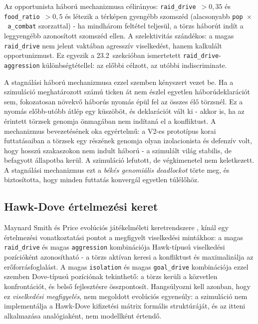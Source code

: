 ﻿\documentclass[a4paper,12pt]{report}
\begin{document}
Az opportunista háború mechanizmusa célirányos: \texttt{raid\_drive}~$> 0{,}35$
és \texttt{food\_ratio}~$> 0{,}5$ és létezik a térképen gyengébb szomszéd
(alacsonyabb \texttt{pop~$\times$~a\_combat} szorzattal) - ha mindhárom feltétel
teljesül, a törzs háborút indít a leggyengébb azonosított szomszéd ellen.
A szelektivitás szándékos: a magas \texttt{raid\_drive} nem jelent vaktában
agresszív viselkedést, hanem kalkulált opportunizmust. Ez egyezik a 23.2~szekcióban
ismertetett \texttt{raid\_drive}-\texttt{aggression} különbségtétellel: az előbbi
célzott, az utóbbi indiscriminate.

A stagnálási háború mechanizmusa ezzel szemben kényszert vezet be. Ha a szimuláció
meghatározott számú ticken át nem észlel egyetlen háborúdeklarációt sem, fokozatosan
növekvő háborús nyomás épül fel az összes élő törzsnél. Ez a nyomás előbb-utóbb
átlép egy küszöböt, és deklarációt vált ki - akkor is, ha az érintett törzsek genomja
önmagában nem indítaná el a konfliktust. A mechanizmus bevezetésének oka egyértelmű:
a V2-es prototípus korai futtatásaiban a törzsek egy részének genomja olyan izolacionista
és defenzív volt, hogy hosszú szakaszokon nem indult háború - a szimulált világ stabilis,
de befagyott állapotba kerül. A szimuláció lefutott, de végkimenetel nem keletkezett.
A stagnálási mechanizmus ezt a \textit{békés genomiális deadlockot} törte meg, és
biztosította, hogy minden futtatás konvergál egyetlen túlélőhöz.

\subsection*{Hawk-Dove értelmezési keret}

Maynard Smith és Price evolúciós játékelméleti keretrendszere \cite{maynardsmithprice1973},
\cite{maynardsmith1982} kínál egy értelmezési vonatkoztatási pontot a megfigyelt
viselkedési mintákhoz: a magas \texttt{raid\_drive} és magas \texttt{aggression}
kombinációja Hawk-típusú viselkedési pozícióként azonosítható - a törzs aktívan keresi
a konfliktust és maximalizálja az erőforrásfoglalást. A magas \texttt{isolation} és magas
\texttt{goal\_drive} kombinációja ezzel szemben Dove-típusú pozíciónak tekinthető:
a törzs kerüli a közvetlen konfrontációt, és belső fejlesztésre összpontosít.
Hangsúlyozni kell azonban, hogy ez \textit{viselkedési megfigyelés}, nem megoldott
evolúciós egyensúly: a szimuláció nem implementálja a Hawk-Dove kifizetési mátrix
formális struktúráját, és az itteni alkalmazása analógiaként, nem modellként értendő.
\end{document}
